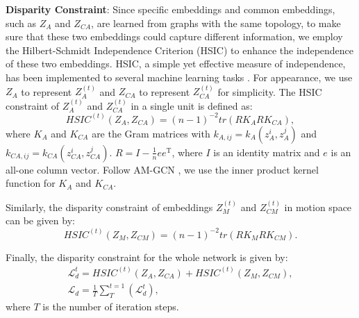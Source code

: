 \documentclass[journal]{IEEEtran}
\begin{document}
\textbf{Disparity Constraint}:
Since specific embeddings and common embeddings, such as $Z_{A}$ and $Z_{CA}$, are learned from graphs with the same topology, to make sure that these two embeddings could capture different information, we employ the Hilbert-Schmidt Independence Criterion (HSIC) \cite{song2007supervised} to enhance the independence of these two embeddings. HSIC, a simple yet effective measure of independence, has been implemented to several machine learning tasks \cite{gretton2005measuring}. For appearance, we use $Z_{A}$ to represent $Z_{A}^{\left(t\right)}$ and $Z_{CA}$ to represent $Z_{CA}^{\left(t\right)}$ for simplicity. The HSIC constraint of $Z_{A}^{\left(t\right)}$ and $Z_{CA}^{\left(t\right)}$ in a single unit is defined as:
\begin{equation}
    HSIC^{\left(t\right)}\left(Z_{A},Z_{CA}\right) = \left(n-1\right)^{-2}tr(RK_ARK_{CA}),
\end{equation}
where $K_A$ and $K_{CA}$ are the Gram matrices with $k_{A,ij} = k_A\left(z^i_A,z^j_A\right)$ and $k_{CA,ij} = k_{CA}\left(z^i_{CA},z^j_{CA}\right)$. $R = I - \frac{1}{n}ee^\mathrm{T}$, where $I$ is an identity matrix and $e$ is an all-one column vector. Follow AM-GCN \cite{wang2020gcn}, we use the inner product kernel function for $K_A$ and $K_{CA}$.

Similarly, the disparity constraint of embeddings $Z_{M}^{\left(t\right)}$ and $Z_{CM}^{\left(t\right)}$ in motion space can be given by:
\begin{equation}
    HSIC^{\left(t\right)}\left(Z_{M},Z_{CM}\right) = \left(n-1\right)^{-2}tr(RK_MRK_{CM}).
\end{equation}

Finally, the disparity constraint for the whole network is given by:
\begin{gather}
\mathcal{L}_d^{t} = HSIC^{\left(t\right)}\left(Z_{A},Z_{CA}\right)+HSIC^{\left(t\right)}\left(Z_{M},Z_{CM}\right), \\
\mathcal{L}_d = \frac{1}{T}\sum^{t=1}_{T}\left(\mathcal{L}_d^{t}\right), \label{eq:disparity}
\end{gather}
where $T$ is the number of iteration steps.
\end{document}
